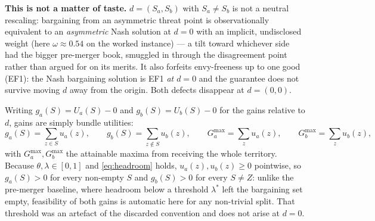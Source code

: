\documentclass[11pt]{article}
\theoremstyle{remark}\newtheorem*{remark}{Remark}
\newcommand{\Sa}{S_a}\newcommand{\Sb}{S_b}\newcommand{\Amax}{G_a^{\max}}\newcommand{\Bmax}{G_b^{\max}}
\begin{document}
\begin{warnbox}
\textbf{This is not a matter of taste.} $d=(\Sa,\Sb)$ with $\Sa\ne\Sb$ is not a neutral
rescaling: bargaining from an asymmetric threat point is observationally equivalent to
an \emph{asymmetric} Nash solution at $d=0$ with an implicit, undisclosed weight (here
$\omega\approx0.54$ on the worked instance) --- a tilt toward whichever side had the
bigger pre-merger book, smuggled in through the disagreement point rather than argued for
on its merits. It also forfeits envy-freeness up to one good (EF1): the Nash bargaining
solution is EF1 \emph{at $d=0$} \citep{caragiannis2019} and the guarantee does not
survive moving $d$ away from the origin. Both defects disappear at $d=(0,0)$.
\end{warnbox}

Writing $g_a(S)=U_a(S)-0$ and $g_b(S)=U_b(S)-0$ for the gains relative to $d$, gains are
simply bundle utilities:
\begin{equation}\label{eq:gains}
g_a(S)=\sum_{z\in S}u_a(z),\qquad g_b(S)=\sum_{z\notin S}u_b(z),\qquad
\Amax=\sum_zu_a(z),\qquad \Bmax=\sum_zu_b(z),
\end{equation}
with $\Amax,\Bmax$ the attainable maxima from receiving the whole territory. Because
$\theta,\lambda\in[0,1]$ and \eqref{eq:headroom} holds, $u_a(z),u_b(z)\ge0$ pointwise, so
$g_a(S)>0$ for every non-empty $S$ and $g_b(S)>0$ for every $S\ne Z$: unlike the
pre-merger baseline, where headroom below a threshold $\lambda^\ast$ left the bargaining
set empty, feasibility of both gains is automatic here for any non-trivial split. That
threshold was an artefact of the discarded convention and does not arise at $d=0$.
\end{document}
